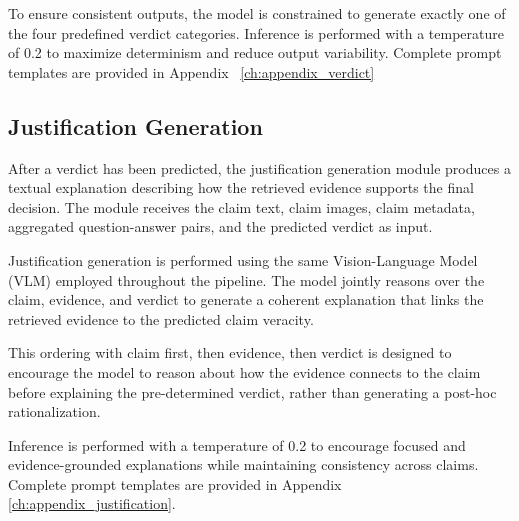 To ensure consistent outputs, the model is constrained to generate exactly one of the four predefined verdict categories. Inference is performed with a temperature of 0.2 to maximize determinism and reduce output variability. Complete prompt templates are provided in Appendix ~\ref{ch:appendix_verdict}

\subsection{Justification Generation}

After a verdict has been predicted, the justification generation module produces a textual explanation describing how the retrieved evidence supports the final decision. The module receives the claim text, claim images, claim metadata, aggregated question-answer pairs, and the predicted verdict as input.

Justification generation is performed using the same Vision-Language Model (VLM) employed throughout the pipeline. The model jointly reasons over the claim, evidence, and verdict to generate a coherent explanation that links the retrieved evidence to the predicted claim veracity.

This ordering with claim first, then evidence, then verdict is designed to encourage the model to reason about how the evidence connects to the claim before explaining the pre-determined verdict, rather than generating a post-hoc rationalization.

Inference is performed with a temperature of 0.2 to encourage focused and evidence-grounded explanations while maintaining consistency across claims. Complete prompt templates are provided in Appendix \ref{ch:appendix_justification}.


